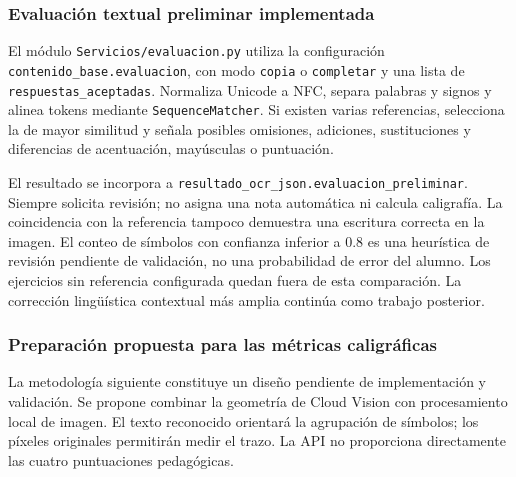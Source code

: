 \subsubsection{Evaluación textual preliminar implementada}
El módulo \texttt{Servicios/evaluacion.py} utiliza la configuración \texttt{contenido\_base.evaluacion}, con modo \texttt{copia} o \texttt{completar} y una lista de \texttt{respuestas\_aceptadas}. Normaliza Unicode a NFC, separa palabras y signos y alinea tokens mediante \texttt{SequenceMatcher}. Si existen varias referencias, selecciona la de mayor similitud y señala posibles omisiones, adiciones, sustituciones y diferencias de acentuación, mayúsculas o puntuación.

El resultado se incorpora a \texttt{resultado\_ocr\_json.evaluacion\_preliminar}. Siempre solicita revisión; no asigna una nota automática ni calcula caligrafía. La coincidencia con la referencia tampoco demuestra una escritura correcta en la imagen. El conteo de símbolos con confianza inferior a 0.8 es una heurística de revisión pendiente de validación, no una probabilidad de error del alumno. Los ejercicios sin referencia configurada quedan fuera de esta comparación. La corrección lingüística contextual más amplia continúa como trabajo posterior.

\subsubsection{Preparación propuesta para las métricas caligráficas}
\label{sec:preparacion-metricas}
La metodología siguiente constituye un diseño pendiente de implementación y validación. Se propone combinar la geometría de Cloud Vision con procesamiento local de imagen. El texto reconocido orientará la agrupación de símbolos; los píxeles originales permitirán medir el trazo. La API no proporciona directamente las cuatro puntuaciones pedagógicas.

